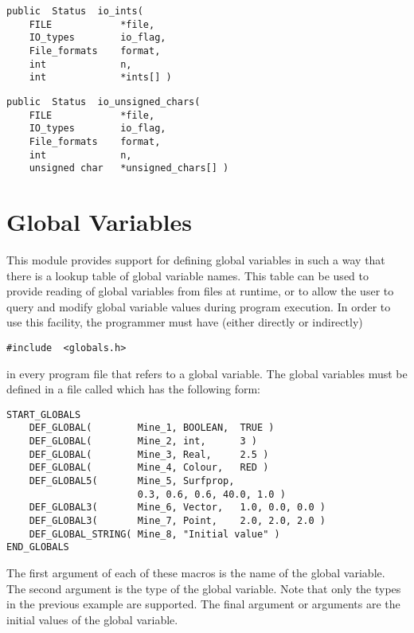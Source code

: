 
{\bf\begin{verbatim}
public  Status  io_ints(
    FILE            *file,
    IO_types        io_flag,
    File_formats    format,
    int             n,
    int             *ints[] )
\end{verbatim}}


{\bf\begin{verbatim}
public  Status  io_unsigned_chars(
    FILE            *file,
    IO_types        io_flag,
    File_formats    format,
    int             n,
    unsigned char   *unsigned_chars[] )
\end{verbatim}}


\section{Global Variables}

This module provides support for defining global variables in such a
way that there is a lookup table of global variable names.  This table
can be used to provide reading of global variables from files at
runtime, or to allow the user to query and modify global variable
values during program execution.  In order to use this facility, the
programmer must have (either directly or indirectly)
{\bf\begin{verbatim}
#include  <globals.h>
\end{verbatim}}
in every program file that refers to a global variable.  The
global variables must be defined in a file called
 which has the following form:
{\bf\begin{verbatim}
START_GLOBALS
    DEF_GLOBAL(        Mine_1, BOOLEAN,  TRUE )
    DEF_GLOBAL(        Mine_2, int,      3 )
    DEF_GLOBAL(        Mine_3, Real,     2.5 )
    DEF_GLOBAL(        Mine_4, Colour,   RED )
    DEF_GLOBAL5(       Mine_5, Surfprop,
                       0.3, 0.6, 0.6, 40.0, 1.0 )
    DEF_GLOBAL3(       Mine_6, Vector,   1.0, 0.0, 0.0 )
    DEF_GLOBAL3(       Mine_7, Point,    2.0, 2.0, 2.0 )
    DEF_GLOBAL_STRING( Mine_8, "Initial value" )
END_GLOBALS
\end{verbatim}}
The first argument of each of these macros is the name of the global
variable.  The second argument is the type of the global variable.
Note that only the types in the previous example are supported.  The
final argument or arguments are the initial values of the global
variable.

